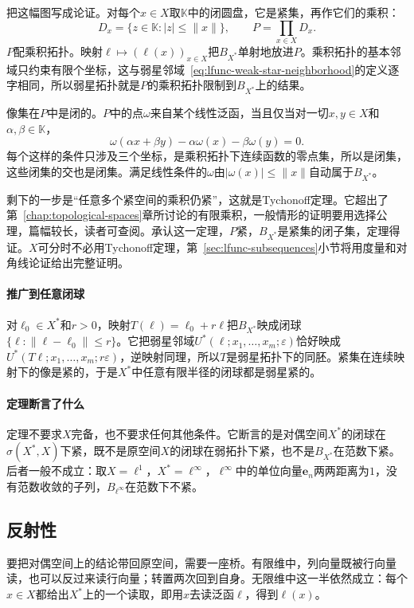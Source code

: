 把这幅图写成论证。对每个$x\in X$取$\mathbb K$中的闭圆盘，它是紧集，再作它们的乘积：
\[
D_x=\{z\in\mathbb K:\lvert z\rvert\leq\lVert x\rVert\},\qquad P=\prod_{x\in X}D_x .
\]
$P$配乘积拓扑。映射$\ell\mapsto(\ell(x))_{x\in X}$把$B_{X^*}$单射地放进$P$。乘积拓扑的基本邻域只约束有限个坐标，这与弱星邻域~\eqref{eq:lfunc-weak-star-neighborhood}的定义逐字相同，所以弱星拓扑就是$P$的乘积拓扑限制到$B_{X^*}$上的结果。

像集在$P$中是闭的。$P$中的点$\omega$来自某个线性泛函，当且仅当对一切$x,y\in X$和$\alpha,\beta\in\mathbb K$，
\[
\omega(\alpha x+\beta y)-\alpha\omega(x)-\beta\omega(y)=0 .
\]
每个这样的条件只涉及三个坐标，是乘积拓扑下连续函数的零点集，所以是闭集，这些闭集的交也是闭集。满足线性条件的$\omega$由$\lvert\omega(x)\rvert\leq\lVert x\rVert$自动属于$B_{X^*}$。

剩下的一步是“任意多个紧空间的乘积仍紧”，这就是Tychonoff定理。它超出了第~\ref{chap:topological-spaces}章所讨论的有限乘积，一般情形的证明要用选择公理，篇幅较长，读者可查阅。承认这一定理，$P$紧，$B_{X^*}$是紧集的闭子集，定理得证。$X$可分时不必用Tychonoff定理，第~\ref{sec:lfunc-subsequences}小节将用度量和对角线论证给出完整证明。

\paragraph{推广到任意闭球}
对$\ell_0\in X^*$和$r>0$，映射$T(\ell)=\ell_0+r\ell$把$B_{X^*}$映成闭球$\{\ell:\lVert\ell-\ell_0\rVert\leq r\}$。它把弱星邻域$U^*(\ell;x_1,\ldots,x_m;\varepsilon)$恰好映成$U^*(T\ell;x_1,\ldots,x_m;r\varepsilon)$，逆映射同理，所以$T$是弱星拓扑下的同胚。紧集在连续映射下的像是紧的，于是$X^*$中任意有限半径的闭球都是弱星紧的。

\paragraph{定理断言了什么}
定理不要求$X$完备，也不要求任何其他条件。它断言的是对偶空间$X^*$的闭球在$\sigma(X^*,X)$下紧，既不是原空间$X$的闭球在弱拓扑下紧，也不是$B_{X^*}$在范数下紧。后者一般不成立：取$X=\ell^1$，$X^*=\ell^\infty$，$\ell^\infty$中的单位向量$\bm e_n$两两距离为$1$，没有范数收敛的子列，$B_{\ell^\infty}$在范数下不紧。

\subsection{反射性}
\label{sec:lfunc-reflexivity}

要把对偶空间上的结论带回原空间，需要一座桥。有限维中，列向量既被行向量读，也可以反过来读行向量；转置两次回到自身。无限维中这一半依然成立：每个$x\in X$都给出$X^*$上的一个读取，即用$x$去读泛函$\ell$，得到$\ell(x)$。

